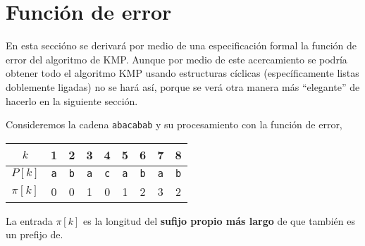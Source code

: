 
\section{Función de error}\label{funcional:funcion_error}
En esta seccióno se derivará por medio de una especificación formal la función de error del
algoritmo de KMP. Aunque por medio de este acercamiento\cite{bird:cyclic} se podría obtener todo
el algoritmo KMP usando estructuras cíclicas (específicamente listas doblemente ligadas) no se
hará así, porque se verá otra manera más ``elegante'' de hacerlo en la siguiente sección.

Consideremos la cadena \texttt{abacabab} y su procesamiento con la función de error,

\begin{table}[h]
\centering
\begin{tabular}{c|c|c|c|c|c|c|c|c|}
\cline{2-9}
$k$      & 1          & 2          & 3          & 4          & 5          & 6          & 7          & 8          \\ \hline
$P[k]$   & \texttt{a} & \texttt{b} & \texttt{a} & \texttt{c} & \texttt{a} & \texttt{b} & \texttt{a} & \texttt{b} \\ \hline
$\pi[k]$ & 0          & 0          & 1          & 0          & 1          & 2          & 3          & 2          \\ \cline{2-9} 
\end{tabular}
\end{table}

\begin{center}
La entrada $\pi[k]$ es la longitud del \textbf{sufijo propio más largo} de
 que también es un prefijo de.
\end{center}

